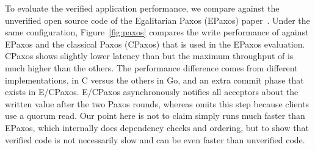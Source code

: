 
To evaluate the verified \wormspace{} application performance, we compare \wormpaxos{} against the unverified open source code of the Egalitarian Paxos (EPaxos) paper~\cite{epaxos}. Under the same configuration, Figure~\ref{fig:paxos} compares the write performance of \wormpaxos{} against EPaxos and the classical Paxos (CPaxos) that is used in the EPaxos evaluation. CPaxos shows slightly lower latency than \wormpaxos{} but the maximum throughput of \wormpaxos{} is much higher than the others. The performance difference comes from different implementations, \wormpaxos{} in C versus the others in Go, and an extra commit phase that exists in E/CPaxos. E/CPaxos asynchronously notifies all acceptors about the written value after the two Paxos rounds, whereas \wormpaxos{} omits this step because \sysname{} clients use a quorum read. Our point here is not to claim \wormpaxos{} simply runs much faster than EPaxos, which internally does dependency checks and ordering, but to show that verified code is not necessarily slow and can be even faster than unverified code.%

